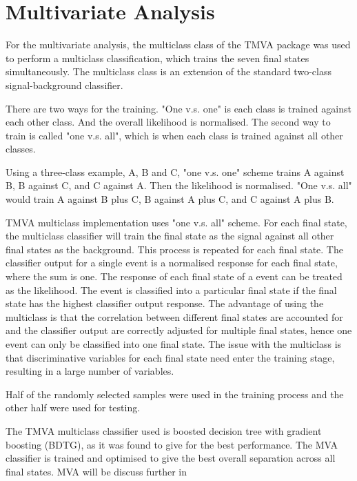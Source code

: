 \section{Multivariate Analysis}

For the multivariate analysis, the multiclass class of the TMVA package \cite{Therhaag:2009dp} was used to perform a multiclass classification, which trains the seven final states simultaneously. The multiclass class is an extension of the standard two-class signal-background classifier.

There are two ways for the training. "One v.s. one" is each class is trained against each other class. And the overall likelihood is normalised. The second way to train is called "one v.s. all", which is when each class is trained against all other classes.

Using a three-class example, A, B and C, "one v.s. one" scheme trains A against B, B against C, and C against A. Then the likelihood is normalised. "One v.s. all" would train A against B plus C, B against A plus C, and C against A plus B.

TMVA multiclass implementation uses "one v.s. all" scheme. For each final state, the multiclass classifier will train the final state as the signal against all other final states as the background. This process is repeated for each final state. The classifier output for a single event is a normalised response for each final state, where the sum is one. The response of each final state of a event can be treated as the likelihood. The event is classified into a particular final state if the final state has the highest classifier output response. The advantage of using the multiclass is that the correlation between different final states are accounted for and the classifier output are correctly adjusted for multiple final states, hence one event can only be classified into one final state. The issue with the multiclass is that discriminative variables for each final state need enter the training stage, resulting in a large number of variables.

Half of the randomly selected samples were used in the training process and the other half were used for testing.

The TMVA multiclass classifier used is boosted decision tree with gradient boosting (BDTG), as it was found to give for the best performance. The MVA classifier is trained and optimised to give the best overall separation across all final states. MVA will be discuss further in \Section{}

